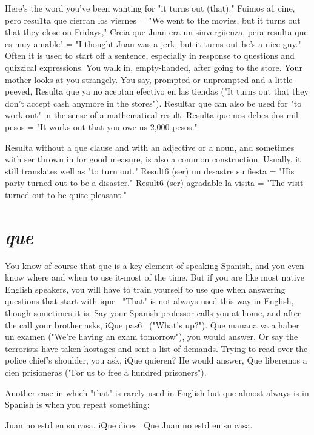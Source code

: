 Here's the word you've been wanting for "it turns out (that)."
Fuimos a1 cine, pero resu1ta que cierran los viernes = "We went to
the movies, but it turns out that they close on Fridays," Creia que
Juan era un sinvergiienza, pera resulta que es muy amable" = "I
thought Juan was a jerk, but it turns out he's a nice guy." Often it is
used to start off a sentence, especially in response to questions and
quizzical expressions. You walk in, empty-handed, after going to the
store. Your mother looks at you strangely. You say, prompted or unprompted and a little peeved, Resulta que ya no aceptan efectivo en
las tiendas ("It turns out that they don't accept cash anymore in the
stores"). Resultar que can also be used for "to work out" in the sense
of a mathematical result. Resulta que nos debes dos mil pesos = "It
works out that you owe us 2,000 pesos."

Resulta without a que clause and with an adjective or a noun,
and sometimes with ser thrown in for good measure, is also a common
construction. Usually, it still translates well as "to turn out." Result6
(ser) un desastre su fiesta = "His party turned out to be a disaster."
Result6 (ser) agradable la visita = "The visit turned out to be quite
pleasant."

\section{\emph{que}}

You know of course that que is a key element of speaking
Spanish, and you even know where and when to use it-most of the
time. But if you are like most native English speakers, you will have
to train yourself to use que when answering questions that start with
ique~ "That" is not always used this way in English, though sometimes it is. Say your Spanish professor calls you at home, and after the
call your brother asks, iQue pas6~ ("What's up?"). Que manana va a
haber un examen ("We're having an exam tomorrow"), you would answer. Or say the terrorists have taken hostages and sent a list of demands. Trying to read over the police chief's shoulder, you ask, iQue
quieren? He would answer, Que liberemos a cien prisioneras ("For us
to free a hundred prisoners").

Another case in which "that" is rarely used in English but que
almost always is in Spanish is when you repeat something:

\bsk

Juan no estd en su casa.
iQue dices~
Que Juan no estd en su casa.

